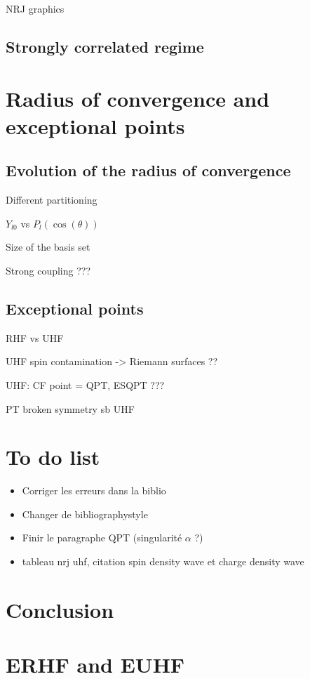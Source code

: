 \documentclass[11pt,a4paper]{article}
\begin{document}
NRJ graphics

\subsection{Strongly correlated regime}

\section{Radius of convergence and exceptional points}

\subsection{Evolution of the radius of convergence}

Different partitioning

$Y_{l0}$ vs $P_l(\cos(\theta))$

Size of the basis set

Strong coupling ???

\subsection{Exceptional points}

RHF vs UHF

UHF spin contamination -> Riemann surfaces ??

UHF: CF point = QPT, ESQPT ???

PT broken symmetry sb UHF

\section{To do list}

\begin{itemize}
\item Corriger les erreurs dans la biblio
\item Changer de bibliographystyle
\item Finir le paragraphe QPT (singularité $\alpha$ ?)
\item tableau nrj uhf, citation spin density wave et charge density wave
\end{itemize}

\section{Conclusion}

\newpage

\printbibliography

\newpage
\appendix

\section{ERHF and EUHF}
\end{document}
